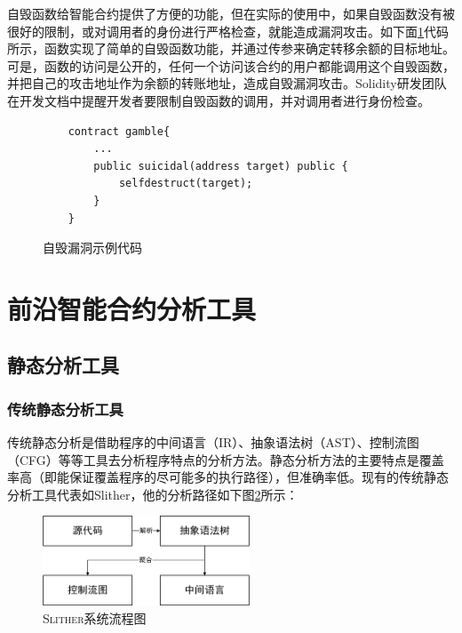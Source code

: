 自毁函数给智能合约提供了方便的功能，但在实际的使用中，如果自毁函数没有被很好的限制，或对调用者的身份进行严格检查，就能造成漏洞攻击。如下面\ref{fig:suicidal_vul}代码所示，函数实现了简单的自毁函数功能，并通过传参来确定转移余额的目标地址。可是，函数的访问是公开的，任何一个访问该合约的用户都能调用这个自毁函数，并把自己的攻击地址作为余额的转账地址，造成自毁漏洞攻击。Solidity研发团队在开发文档中提醒开发者要限制自毁函数的调用，并对调用者进行身份检查。

\begin{figure}
\begin{minipage}[htb]{1.0\linewidth}
    \begin{lstlisting}
    contract gamble{
        ...
        public suicidal(address target) public {
            selfdestruct(target);
        }
    }
    \end{lstlisting}
\end{minipage}
\vspace{-5mm}
\caption{自毁漏洞示例代码}
\label{fig:suicidal_vul}
\end{figure}


\section{前沿智能合约分析工具}

\subsection{静态分析工具}

\subsubsection{传统静态分析工具}

传统静态分析是借助程序的中间语言（IR）、抽象语法树（AST）、控制流图（CFG）等等工具去分析程序特点的分析方法。静态分析方法的主要特点是覆盖率高（即能保证覆盖程序的尽可能多的执行路径），但准确率低。现有的传统静态分析工具代表如Slither，他的分析路径如下图\ref{fig:slither_proccess}所示：

\begin{figure}[h]
\vspace{+2mm}
  \centering
  \includegraphics[width=0.55\textwidth]{figures/slither_process.png}
  \caption{\textsc{Slither}系统流程图}
  \vspace{-5mm}
  \label{fig:slither_proccess}
\end{figure}

